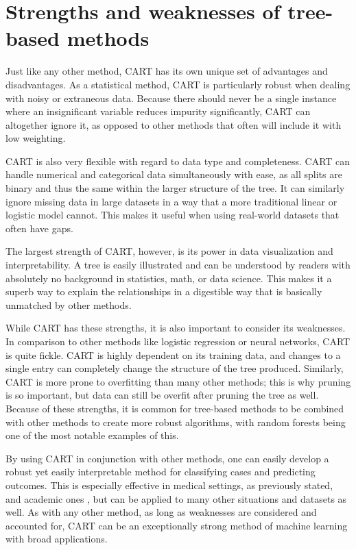 \documentclass[12pt,english,letterpaper]{article}
\begin{document}
\section{Strengths and weaknesses of tree-based methods}

Just like any other method, CART has its own unique set of advantages and disadvantages. As a statistical method, CART is particularly robust when dealing with noisy or extraneous data. Because there should never be a single instance where an insignificant variable reduces impurity significantly, CART can altogether ignore it, as opposed to other methods that often will include it with low weighting.

CART is also very flexible with regard to data type and completeness. CART can handle numerical and categorical data simultaneously with ease, as all splits are binary and thus the same within the larger structure of the tree. It can similarly ignore missing data in large datasets in a way that a more traditional linear or logistic model cannot. This makes it useful when using real-world datasets that often have gaps.

The largest strength of CART, however, is its power in data visualization and interpretability. A tree is easily illustrated and can be understood by readers with absolutely no background in statistics, math, or data science. This makes it a superb way to explain the relationships in a digestible way that is basically unmatched by other methods.

While CART has these strengths, it is also important to consider its weaknesses. In comparison to other methods like logistic regression or neural networks, CART is quite fickle. CART is highly dependent on its training data, and changes to a single entry can completely change the structure of the tree produced. Similarly, CART is more prone to overfitting than many other methods; this is why pruning is so important, but data can still be overfit after pruning the tree as well. Because of these strengths, it is common for tree-based methods to be combined with other methods to create more robust algorithms, with random forests being one of the most notable examples of this.

By using CART in conjunction with other methods, one can easily develop a robust yet easily interpretable method for classifying cases and predicting outcomes. This is especially effective in medical settings, as previously stated, and academic ones \cite{breiman}, but can be applied to many other situations and datasets as well. As with any other method, as long as weaknesses are considered and accounted for, CART can be an exceptionally strong method of machine learning with broad applications.

\printbibliography[heading=bibintoc,title={Sources}]
\end{document}
